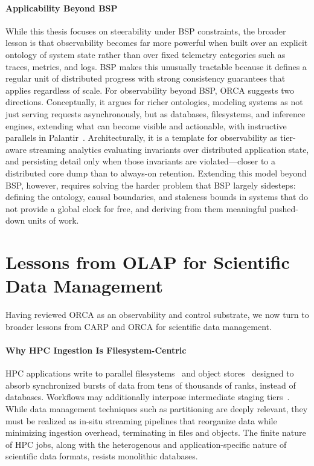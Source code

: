 \paragraph{Applicability Beyond BSP}
While this thesis focuses on steerability under BSP constraints,
the broader lesson is that
observability becomes far more powerful when built over an explicit ontology of system state rather
than over fixed telemetry categories such as traces, metrics, and logs.
BSP makes this unusually tractable because it defines a regular unit of distributed
progress with strong consistency guarantees that applies regardless of scale.
For observability beyond BSP, ORCA suggests two directions.
Conceptually, it argues for
richer ontologies, modeling systems as not just serving requests asynchronously, but as
databases, filesystems, and inference engines, extending what can become visible and
actionable, with instructive parallels in Palantir~\cite{:PalantirOntology}.
Architecturally, it is a template for observability as tier-aware streaming
analytics evaluating invariants over distributed application state, and persisting detail
only when
those invariants are violated---closer to a distributed core dump than to always-on retention.
Extending this model beyond BSP, however, requires solving the harder problem that BSP largely
sidesteps: defining the ontology, causal boundaries,
and staleness bounds in systems that do not provide a global clock for free,
and deriving from them meaningful pushed-down units of work.


\section{Lessons from OLAP for Scientific Data Management}\label{sec:concl:olap}

Having reviewed ORCA as an observability and control substrate, we now turn to broader lessons from
CARP and ORCA for scientific data management.

\paragraph{Why HPC Ingestion Is Filesystem-Centric}
HPC applications write to parallel
filesystems~\cite{Braam2002:Lustre,Schmu2002:GPFS,:VDURA,2025:VASTAI,:WekaIO,:Hammerspace} and
object
stores~\cite{Liang2020:DAOS} designed to
absorb synchronized bursts of data from tens of thousands of ranks, instead of databases.
Workflows may additionally interpose intermediate staging tiers~\cite{Liu2012:RoleBurstBuffers}.
While data management techniques such as partitioning are deeply relevant,
they must be realized as in-situ streaming pipelines that reorganize data while minimizing
ingestion overhead, terminating in files and objects.
The finite nature of HPC jobs, along with the heterogenous and application-specific nature of
scientific data formats, resists monolithic databases.


